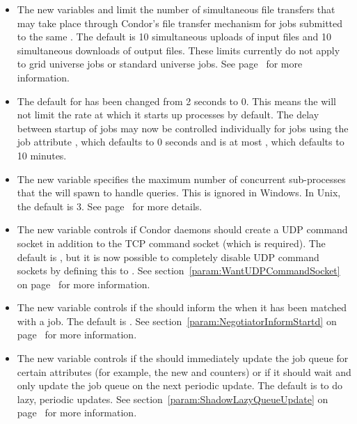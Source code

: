 \begin{itemize}

\item The new variables  and
 limit the number of simultaneous file
transfers that may take place through Condor's file transfer mechanism
for jobs submitted to the same .  The default is 10
simultaneous uploads of input files and 10 simultaneous downloads of
output files.  These limits currently do not apply to grid universe
jobs or standard universe jobs.  See
page~\pageref{param:MaxConcurrentDownloads} for more information.

\item The default for  has been changed
from 2 seconds to 0.  This means the  will not limit
the rate at which it starts up  processes by default.
The delay between startup of jobs may now be controlled individually
for jobs using the job attribute , which
defaults to 0 seconds and is at most ,
which defaults to 10 minutes.

\item The new variable  specifies the
maximum number of concurrent sub-processes that the 
will spawn to handle queries.  This is ignored in Windows.  In Unix,
the default is 3.  See page~\pageref{param:ScheddQueryWorkers} for
more details.

\item The new variable  controls
  if Condor daemons should create a UDP command socket in addition to
  the TCP command socket (which is required).
  The default is , but it is now possible to completely
  disable UDP command sockets by defining this to .
  See section~\ref{param:WantUDPCommandSocket} on
  page~\pageref{param:WantUDPCommandSocket} for more information.

\item The new variable  controls if
  the  should inform the  when it
  has been matched with a job.
  The default is .
  See section~\ref{param:NegotiatorInformStartd} on
  page~\pageref{param:NegotiatorInformStartd} for more information.

\item The new variable  controls if
  the  should immediately update the job queue for
  certain attributes (for example, the new  and
   counters) or if it should wait and only
  update the job queue on the next periodic update.
  The default is  to do lazy, periodic updates.
  See section~\ref{param:ShadowLazyQueueUpdate} on
  page~\pageref{param:ShadowLazyQueueUpdate} for more information.


\end{itemize}
